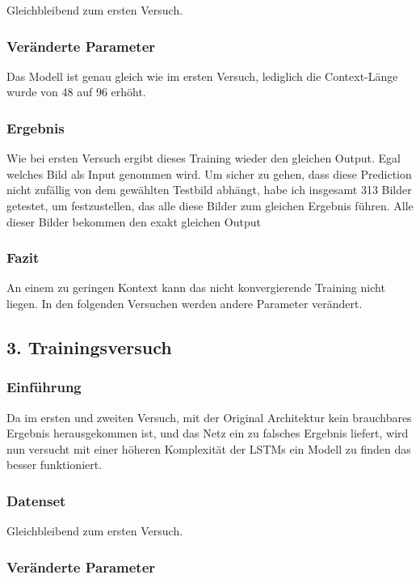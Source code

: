 \documentclass[pdftex,a4paper,halfparskip, article]{scrartcl}
\begin{document}
Gleichbleibend zum ersten Versuch.

\subsubsection*{Veränderte Parameter}

Das Modell ist genau gleich wie im ersten Versuch, lediglich die Context-Länge wurde von 48 auf 96 erhöht.

\subsubsection*{Ergebnis}

Wie bei ersten Versuch ergibt dieses Training wieder den gleichen Output. Egal welches Bild als Input genommen wird. Um sicher zu gehen, dass diese Prediction nicht zufällig von dem gewählten Testbild abhängt, habe ich insgesamt 313 Bilder getestet, um festzustellen, das alle diese Bilder zum gleichen Ergebnis führen. Alle dieser Bilder bekommen den exakt gleichen Output

\subsubsection*{Fazit}

An einem zu geringen Kontext kann das nicht konvergierende Training nicht liegen. In den folgenden Versuchen werden andere Parameter verändert.

\subsection{3. Trainingsversuch}


\subsubsection*{Einführung}

Da im ersten und zweiten Versuch, mit der Original Architektur kein brauchbares Ergebnis herausgekommen ist, und das Netz ein zu falsches Ergebnis liefert, wird nun versucht mit einer höheren Komplexität der LSTMs ein Modell zu finden das besser funktioniert.

\subsubsection*{Datenset}

Gleichbleibend zum ersten Versuch.

\subsubsection*{Veränderte Parameter}
\end{document}
